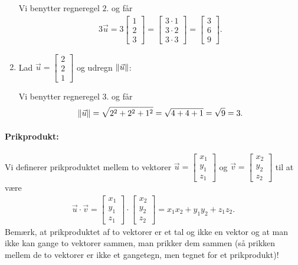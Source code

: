 \begin{enumerate}
Vi benytter regneregel $2$. og får
\begin{align*}
3\vec{u} = 3\begin{bmatrix} 1 \\ 2 \\ 3 \end{bmatrix} = \begin{bmatrix} 3\cdot 1 \\ 3 \cdot 2 \\ 3 \cdot 3 \end{bmatrix}  = \begin{bmatrix} 3 \\ 6 \\ 9 \end{bmatrix}. 
\end{align*}
\item Lad $\vec{u}= \begin{bmatrix} 2 \\ 2 \\ 1 \end{bmatrix}$ og udregn $\Vert \vec{u}\Vert$:

Vi benytter regneregel $3.$ og får
\begin{align*}
\Vert \vec{u}\Vert = \sqrt{2^2+2^2 + 1^2} = \sqrt{4+4+1}= \sqrt{9}=3.
\end{align*}
\end{enumerate}

\paragraph*{Prikprodukt:}
Vi definerer prikproduktet mellem to vektorer $\vec{u} = \begin{bmatrix} x_1 \\ y_1 \\ z_1 \end{bmatrix}$ og $\vec{v} = \begin{bmatrix} x_2 \\ y_2 \\ z_2 \end{bmatrix}$ til at være
\begin{align}\label{eq:vec3d1prikprodukt}
\vec{u} \cdot \vec{v} =\begin{bmatrix} x_1 \\ y_1 \\ z_1 \end{bmatrix} \cdot \begin{bmatrix} x_2 \\ y_2 \\ z_2 \end{bmatrix} = x_1 x_2 + y_1  y_2 + z_1z_2.
\end{align}
Bemærk, at prikproduktet af to vektorer er et tal og ikke en vektor og at man ikke kan gange to vektorer sammen, man prikker dem sammen (så prikken mellem de to vektorer er ikke et gangetegn, men tegnet for et prikprodukt)!

